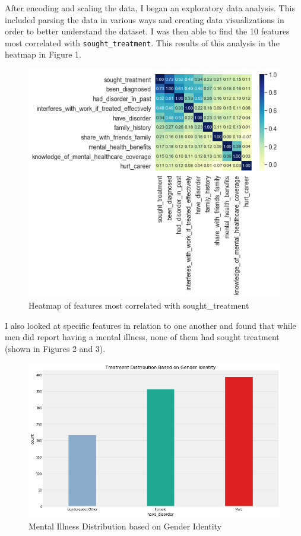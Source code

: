 \documentclass{article}
\begin{document}
After encoding and scaling the data, I began an exploratory data analysis. This included parsing the data in various ways and creating data visualizations in order to better understand the dataset. I was then able to find the 10 features most correlated with {\tt sought\_treatment}. This results of this analysis in the heatmap in Figure 1.

\begin{figure}
  \includegraphics[width=\linewidth]{corrmat.png}
  \caption{Heatmap of features most correlated with sought\_treatment}
  \label{fig:corrmat}
\end{figure}
 I also looked at specific features in relation to one another and found that while men did report having a mental illness, none of them had sought treatment (shown in Figures 2 and 3). 
 \begin{figure}
  \includegraphics[width=\linewidth]{have_disorder.png}
  \caption{Mental Illness Distribution based on Gender Identity}
  \label{fig:have_disorder}
\end{figure}
\end{document}

